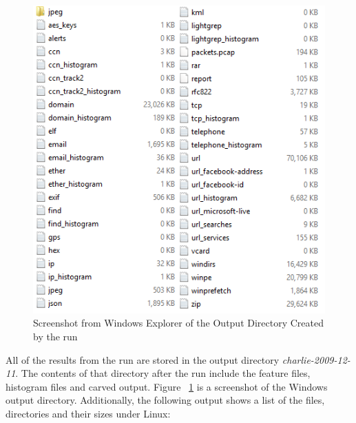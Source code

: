 \endgroup
\begin{figure}
	\center
	\includegraphics[scale=1.00]{charlieRunOutput.png}
	\caption{Screenshot from Windows Explorer of the Output Directory Created by the \bulk run}
	\label{fig:charlieOutput}
\end{figure}
All of the results from the \bulk run are stored in the output directory \textit{charlie-2009-12-11}. The contents of that directory after the run include the feature files, histogram files and carved output. Figure ~\ref{fig:charlieOutput} is a screenshot of the Windows output directory. Additionally, the following output shows a list of the files, directories and their sizes under Linux:

